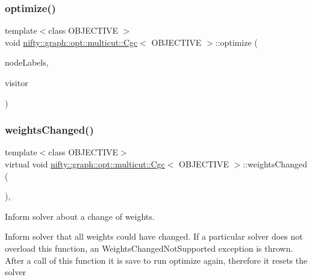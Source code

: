 \subsubsection{\texorpdfstring{optimize()}{optimize()}}
{\footnotesize\ttfamily template$<$class O\+B\+J\+E\+C\+T\+I\+VE $>$ \\
void \hyperlink{classnifty_1_1graph_1_1opt_1_1multicut_1_1Cgc}{nifty\+::graph\+::opt\+::multicut\+::\+Cgc}$<$ O\+B\+J\+E\+C\+T\+I\+VE $>$\+::optimize (\begin{DoxyParamCaption}\item[{\hyperlink{classnifty_1_1graph_1_1opt_1_1multicut_1_1Cgc_a19f52bf3f00bed2816bd44604b94e7af}{Node\+Labels\+Type} \&}]{node\+Labels,  }\item[{\hyperlink{classnifty_1_1graph_1_1opt_1_1multicut_1_1Cgc_a6d429c6a15de0e6fb98c94ad4fec14f0}{Visitor\+Base\+Type} $\ast$}]{visitor }\end{DoxyParamCaption})\hspace{0.3cm}{\ttfamily [virtual]}}

\mbox{\label{classnifty_1_1graph_1_1opt_1_1multicut_1_1Cgc_aff65d0bc2f7537bf328c47979a3293d5}} 
\subsubsection{\texorpdfstring{weights\+Changed()}{weightsChanged()}}
{\footnotesize\ttfamily template$<$class O\+B\+J\+E\+C\+T\+I\+VE$>$ \\
virtual void \hyperlink{classnifty_1_1graph_1_1opt_1_1multicut_1_1Cgc}{nifty\+::graph\+::opt\+::multicut\+::\+Cgc}$<$ O\+B\+J\+E\+C\+T\+I\+VE $>$\+::weights\+Changed (\begin{DoxyParamCaption}{ }\end{DoxyParamCaption})\hspace{0.3cm}{\ttfamily [inline]}, {\ttfamily [virtual]}}



Inform solver about a change of weights. 

Inform solver that all weights could have changed. If a particular solver does not overload this function, an Weights\+Changed\+Not\+Supported exception is thrown. After a call of this function it is save to run optimize again, therefore it resets the solver 

